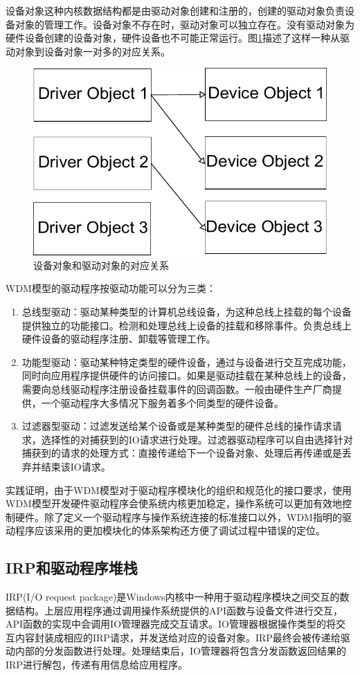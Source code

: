 设备对象这种内核数据结构都是由驱动对象创建和注册的，创建的驱动对象负责设备对象的管理工作。设备对象不存在时，驱动对象可以独立存在。没有驱动对象为硬件设备创建的设备对象，硬件设备也不可能正常运行。图\ref{fig:drv-to-dev}描述了这样一种从驱动对象到设备对象一对多的对应关系。
\begin{figure}[H]
\centering
\includegraphics[width=0.6\linewidth]{./graph/drv-to-dev}
\caption{设备对象和驱动对象的对应关系}
\label{fig:drv-to-dev}
\end{figure}

WDM模型的驱动程序按驱动功能可以分为三类：
\begin{enumerate}
\item
总线型驱动：驱动某种类型的计算机总线设备，为这种总线上挂载的每个设备提供独立的功能接口。检测和处理总线上设备的挂载和移除事件。负责总线上硬件设备的驱动程序注册、卸载等管理工作。
\item
功能型驱动：驱动某种特定类型的硬件设备，通过与设备进行交互完成功能，同时向应用程序提供硬件的访问接口。如果是驱动挂载在某种总线上的设备，需要向总线驱动程序注册设备挂载事件的回调函数。一般由硬件生产厂商提供，一个驱动程序大多情况下服务着多个同类型的硬件设备。
\item
过滤器型驱动：过滤发送给某个设备或是某种类型的硬件总线的操作请求请求，选择性的对捕获到的IO请求进行处理。过滤器驱动程序可以自由选择针对捕获到的请求的处理方式：直接传递给下一个设备对象、处理后再传递或是丢弃并结束该IO请求。
\end{enumerate}

实践证明，由于WDM模型对于驱动程序模块化的组织和规范化的接口要求，使用WDM模型开发硬件驱动程序会使系统内核更加稳定，操作系统可以更加有效地控制硬件。除了定义一个驱动程序与操作系统连接的标准接口以外，WDM指明的驱动程序应该采用的更加模块化的体系架构还方便了调试过程中错误的定位。

\subsection{IRP和驱动程序堆栈}
IRP(I/O request package)是Windows内核中一种用于驱动程序模块之间交互的数据结构。上层应用程序通过调用操作系统提供的API函数与设备文件进行交互，API函数的实现中会调用IO管理器完成交互请求。IO管理器根据操作类型的将交互内容封装成相应的IRP请求，并发送给对应的设备对象。IRP最终会被传递给驱动内部的分发函数进行处理。处理结束后，IO管理器将包含分发函数返回结果的IRP进行解包，传递有用信息给应用程序。

